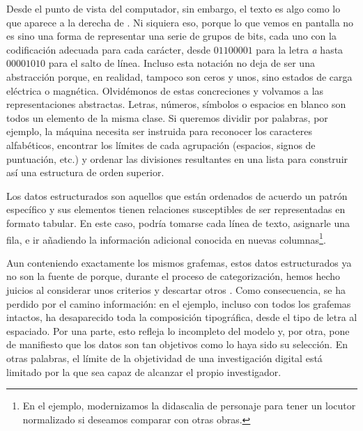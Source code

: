 Desde el punto de vista del computador, sin embargo, el texto es algo como lo que aparece a la derecha de . Ni siquiera eso, porque lo que vemos en pantalla no es sino una forma de representar una serie de grupos de bits, cada uno con la codificación adecuada para cada carácter, desde $01100001$ para la letra \textit{a} hasta $00001010$ para el salto de línea. Incluso esta notación no deja de ser una abstracción porque, en realidad, tampoco son ceros y unos, sino estados de carga eléctrica o magnética. Olvidémonos de estas concreciones y volvamos a las representaciones abstractas. Letras, números, símbolos o espacios en blanco son todos un elemento de la misma clase. Si queremos dividir por palabras, por ejemplo, la máquina necesita ser instruida para reconocer los caracteres alfabéticos, encontrar los límites de cada agrupación (espacios, signos de puntuación, etc.) y ordenar las divisiones resultantes en una lista para construir así una estructura de orden superior.

Los datos estructurados son aquellos que están ordenados de acuerdo un patrón específico y sus elementos tienen relaciones susceptibles de ser representadas en formato tabular. En este caso, podría tomarse cada línea de texto, asignarle una fila, e ir añadiendo la información adicional conocida en nuevas columnas\footnote{En el ejemplo, modernizamos la didascalia de personaje para tener un locutor normalizado si deseamos comparar con otras obras.}.



Aun conteniendo exactamente los mismos grafemas, estos datos estructurados ya no son la fuente de  porque, durante el proceso de categorización, hemos hecho juicios al considerar unos criterios y descartar otros \parencite[21]{drucker2021}. Como consecuencia, se ha perdido por el camino información: en el ejemplo, incluso con todos los grafemas intactos, ha desaparecido toda la composición tipográfica, desde el tipo de letra al espaciado. Por una parte, esto refleja lo incompleto del modelo y, por otra, pone de manifiesto que los datos son tan objetivos como lo haya sido su selección. En otras palabras, el límite de la objetividad de una investigación digital está limitado por la que sea capaz de alcanzar el propio investigador.

